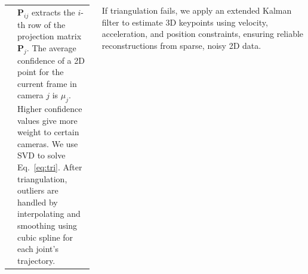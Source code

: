 \documentclass[900pt, a0paper, landscape]{tikzposter}
\begin{document}
\begin{columns}
{\begin{tabular}{@{}p{0.55\textwidth}@{} p{0.43\textwidth}@{}}
         &
        \vspace{-290pt}
        \hspace{-1100pt}
        \parbox[t]{0.55\linewidth}{
            $\mathbf{P}_{ij}$ extracts the $i$-th row of the projection matrix $\mathbf{P}_{j}$.  The average confidence of a 2D point for the current frame in camera $j$ is $\mu_{j}$. Higher confidence values give more weight to certain cameras.
            We use SVD to solve Eq.~\ref{eq:tri}. After triangulation, outliers are handled by interpolating and smoothing using cubic spline for each joint's trajectory. 
        }
    \end{tabular}
     \vskip -1.4cm

If triangulation fails, we apply an extended Kalman filter to estimate 3D keypoints using velocity, acceleration, and position constraints, ensuring reliable reconstructions from sparse, noisy 2D data.
}


\end{columns}
\end{document}
